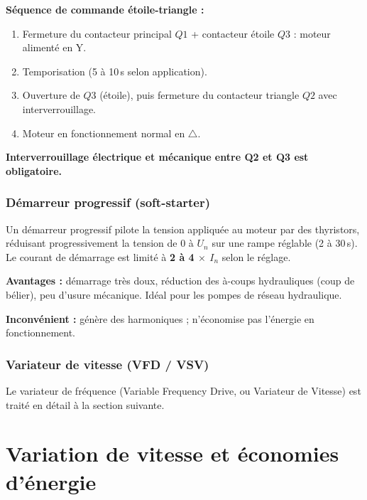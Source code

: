 \begin{methode}
  \textbf{Séquence de commande étoile-triangle :}
  \begin{enumerate}
    \item Fermeture du contacteur principal $Q1$ + contacteur étoile $Q3$ : moteur alimenté en Y.
    \item Temporisation (5 à 10\,s selon application).
    \item Ouverture de $Q3$ (étoile), puis fermeture du contacteur triangle $Q2$ avec interverrouillage.
    \item Moteur en fonctionnement normal en $\triangle$.
  \end{enumerate}
  \textbf{Interverrouillage électrique et mécanique entre Q2 et Q3 est obligatoire.}
\end{methode}

\subsubsection{Démarreur progressif (soft-starter)}

\begin{definition}
  Un démarreur progressif pilote la tension appliquée au moteur par des thyristors, réduisant progressivement la tension de 0 à $U_n$ sur une rampe réglable (2 à 30\,s). Le courant de démarrage est limité à \textbf{2 à 4 $\times$ $I_n$} selon le réglage.

  \textbf{Avantages :} démarrage très doux, réduction des à-coups hydrauliques (coup de bélier), peu d'usure mécanique. Idéal pour les pompes de réseau hydraulique.

  \textbf{Inconvénient :} génère des harmoniques ; n'économise pas l'énergie en fonctionnement.
\end{definition}

\subsubsection{Variateur de vitesse (VFD / VSV)}

Le variateur de fréquence (Variable Frequency Drive, ou Variateur de Vitesse) est traité en détail à la section suivante.

\section{Variation de vitesse et économies d'énergie}

